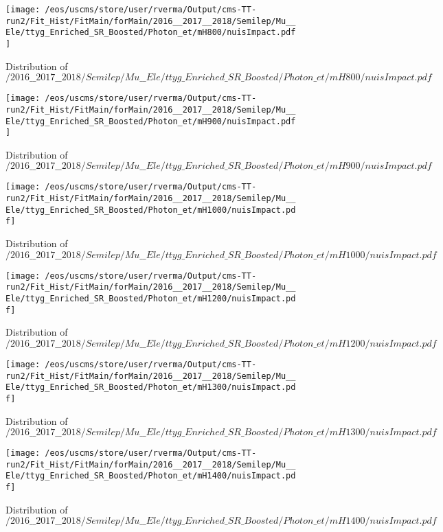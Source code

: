 \begin{figure}
\centering
\texttt{[image: /eos/uscms/store/user/rverma/Output/cms-TT-run2/Fit\_Hist/FitMain/forMain/2016\_\_2017\_\_2018/Semilep/Mu\_\_Ele/ttyg\_Enriched\_SR\_Boosted/Photon\_et/mH800/nuisImpact.pdf]}
\caption{Distribution of $/2016\_\_2017\_\_2018/Semilep/Mu\_\_Ele/ttyg\_Enriched\_SR\_Boosted/Photon\_et/mH800/nuisImpact.pdf$}
\end{figure}

\begin{figure}
\centering
\texttt{[image: /eos/uscms/store/user/rverma/Output/cms-TT-run2/Fit\_Hist/FitMain/forMain/2016\_\_2017\_\_2018/Semilep/Mu\_\_Ele/ttyg\_Enriched\_SR\_Boosted/Photon\_et/mH900/nuisImpact.pdf]}
\caption{Distribution of $/2016\_\_2017\_\_2018/Semilep/Mu\_\_Ele/ttyg\_Enriched\_SR\_Boosted/Photon\_et/mH900/nuisImpact.pdf$}
\end{figure}

\begin{figure}
\centering
\texttt{[image: /eos/uscms/store/user/rverma/Output/cms-TT-run2/Fit\_Hist/FitMain/forMain/2016\_\_2017\_\_2018/Semilep/Mu\_\_Ele/ttyg\_Enriched\_SR\_Boosted/Photon\_et/mH1000/nuisImpact.pdf]}
\caption{Distribution of $/2016\_\_2017\_\_2018/Semilep/Mu\_\_Ele/ttyg\_Enriched\_SR\_Boosted/Photon\_et/mH1000/nuisImpact.pdf$}
\end{figure}

\begin{figure}
\centering
\texttt{[image: /eos/uscms/store/user/rverma/Output/cms-TT-run2/Fit\_Hist/FitMain/forMain/2016\_\_2017\_\_2018/Semilep/Mu\_\_Ele/ttyg\_Enriched\_SR\_Boosted/Photon\_et/mH1200/nuisImpact.pdf]}
\caption{Distribution of $/2016\_\_2017\_\_2018/Semilep/Mu\_\_Ele/ttyg\_Enriched\_SR\_Boosted/Photon\_et/mH1200/nuisImpact.pdf$}
\end{figure}

\begin{figure}
\centering
\texttt{[image: /eos/uscms/store/user/rverma/Output/cms-TT-run2/Fit\_Hist/FitMain/forMain/2016\_\_2017\_\_2018/Semilep/Mu\_\_Ele/ttyg\_Enriched\_SR\_Boosted/Photon\_et/mH1300/nuisImpact.pdf]}
\caption{Distribution of $/2016\_\_2017\_\_2018/Semilep/Mu\_\_Ele/ttyg\_Enriched\_SR\_Boosted/Photon\_et/mH1300/nuisImpact.pdf$}
\end{figure}

\begin{figure}
\centering
\texttt{[image: /eos/uscms/store/user/rverma/Output/cms-TT-run2/Fit\_Hist/FitMain/forMain/2016\_\_2017\_\_2018/Semilep/Mu\_\_Ele/ttyg\_Enriched\_SR\_Boosted/Photon\_et/mH1400/nuisImpact.pdf]}
\caption{Distribution of $/2016\_\_2017\_\_2018/Semilep/Mu\_\_Ele/ttyg\_Enriched\_SR\_Boosted/Photon\_et/mH1400/nuisImpact.pdf$}
\end{figure}

